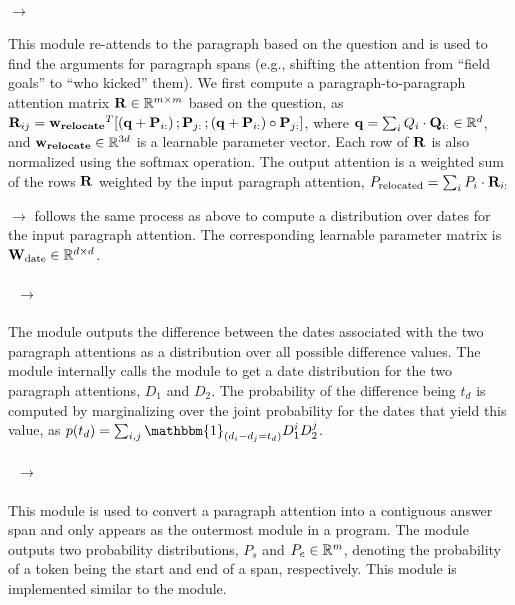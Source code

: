 \documentclass{article}
\begin{document}
\paragraph{ $\rightarrow$ \typePara}\mbox{}%
This module re-attends to the paragraph based on the question and is used to find the arguments for paragraph spans (e.g., shifting the attention from ``field goals'' to ``who kicked'' them).
We first compute a paragraph-to-paragraph attention matrix $\mathbf{R} \in \mathbb{R}^{m \times m}$ based on the question, as $\mathbf{R}_{ij} = \mathbf{w_{relocate}}^{T} [(\mathbf{q} + \mathbf{P}_{i:}) \, ; \mathbf{P}_{j:}\, ; (\mathbf{q} + \mathbf{P}_{i:}) \circ \mathbf{P}_{j:}]$, where $\mathbf{q} = \sum_{i} Q_{i} \cdot \mathbf{Q}_{i:} \in \mathbb{R}^{d}$, and $\mathbf{w_{relocate}} \in \mathbb{R}^{3d}$ is a learnable parameter vector.
Each row of $\mathbf{R}$ is also normalized using the softmax operation.
The output attention is a weighted sum of the rows $\mathbf{R}$ weighted by the input paragraph attention, $P_{\text{relocated}} = \sum_{i} P_{i}\cdot \mathbf{R}_{i:}$

\textbf{ $\rightarrow$ \typeDate}
follows the same process as above to compute a distribution over dates for the input paragraph attention. The corresponding learnable parameter matrix is $\mathbf{W_{\text{date}}} \in \mathbb{R}^{d \times d}$.


\paragraph{~$\rightarrow$~\typeTD}\mbox{}%
The module outputs the difference between the dates associated with the two paragraph attentions as a distribution over all possible difference values. %
%
The module internally calls the  module to get a date distribution for the two paragraph attentions, $D_{1}$ and ${D_{2}}$.
The probability of the difference being $t_{d}$ is computed by marginalizing over the joint probability for the dates that yield this value, as $p(t_{d}) = \sum_{i, j} \mathbbm{1}_{(d_{i} - d_{j} = t_{d})}  D_{1}^{i} D_{2}^{j}$.

\paragraph{~$\rightarrow$~\typeSpan}\mbox{}%
\noindent
This module is used to convert a paragraph attention into a contiguous answer span and only appears as the outermost module in a program.  The module outputs two probability distributions, $P_{s}$ and $P_{e} \in \mathbb{R}^{m}$, denoting the probability of a token being the start and end of a span, respectively.
This module is implemented similar to the  module. %
\end{document}
